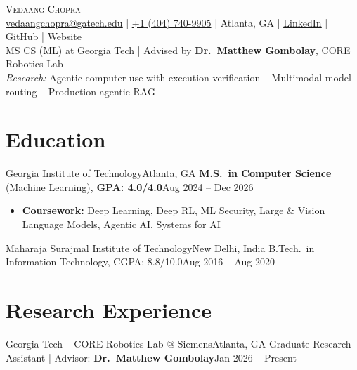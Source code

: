 \documentclass[letterpaper,11pt]{article}
\begin{document}
\begin{center}
  {\Huge \scshape Vedaang Chopra} \\ \vspace{2pt}
  \small
  \href{mailto:vedaangchopra@gatech.edu}{\underline{vedaangchopra@gatech.edu}} \;|\;
  \underline{+1 (404) 740-9905} \;|\;
  Atlanta, GA \;|\;
  \href{https://linkedin.com/in/vedaang-chopra}{\underline{LinkedIn}} \;|\;
  \href{https://github.com/Vedaang-Chopra}{\underline{GitHub}} \;|\;
  \href{https://vedaangchopra.live/}{\underline{Website}}
  \\ \vspace{3pt}
  \small
  MS CS (ML) at Georgia Tech \;|\; Advised by \textbf{Dr.\ Matthew Gombolay}, CORE Robotics Lab \\
  \textit{Research:} Agentic computer-use with execution verification -- Multimodal model routing -- Production agentic RAG
\end{center}
\vspace{-6pt}

\section{Education}
\resumeSubHeadingListStart
\resumeSubheading
{Georgia Institute of Technology}{Atlanta, GA}
{\textbf{M.S.\ in Computer Science} (Machine Learning), \textbf{GPA: 4.0/4.0}}{Aug 2024 -- Dec 2026}
\vspace{-3pt}
\begin{itemize}[leftmargin=0.20in, topsep=0pt, itemsep=0pt]
  \item\footnotesize{\textbf{Coursework:} Deep Learning, Deep RL, ML Security, Large \& Vision Language Models, Agentic AI, Systems for AI}
\end{itemize}
\vspace{-6pt}
\resumeEducationCompact
{Maharaja Surajmal Institute of Technology}{New Delhi, India}
{B.Tech.\ in Information Technology, CGPA: 8.8/10.0}{Aug 2016 -- Aug 2020}
\resumeSubHeadingListEnd

\section{Research Experience}
\resumeSubHeadingListStart
\resumeSubheading
{Georgia Tech -- CORE Robotics Lab @ Siemens}{Atlanta, GA}
{Graduate Research Assistant \;|\; Advisor: \textbf{Dr.\ Matthew Gombolay}}{Jan 2026 -- Present}
\resumeItemListStart
\resumeItemListEnd
\end{document}
